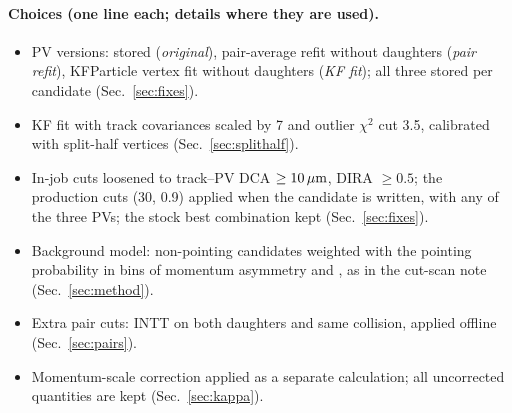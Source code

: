 \paragraph{Choices (one line each; details where they are used).}
\begin{itemize}
\item PV versions: stored (\emph{original}), pair-average refit without daughters (\emph{pair refit}), KFParticle
  vertex fit without daughters (\emph{KF fit}); all three stored per candidate (Sec.~\ref{sec:fixes}).
\item KF fit with track covariances scaled by 7 and outlier $\chi^2$ cut 3.5, calibrated with split-half vertices
  (Sec.~\ref{sec:splithalf}).
\item In-job cuts loosened to track--PV DCA $\geq 10\,\mu\mathrm{m}$, DIRA $\geq 0.5$; the production cuts (30\um, 0.9) applied
  when the candidate is written, with any of the three PVs; the stock best combination kept (Sec.~\ref{sec:fixes}).
\item Background model: non-pointing candidates weighted with the pointing probability in bins of momentum asymmetry
  and \Dzero{} \pt{}, as in the cut-scan note (Sec.~\ref{sec:method}).
\item Extra pair cuts: INTT on both daughters and same collision, applied offline (Sec.~\ref{sec:pairs}).
\item Momentum-scale correction applied as a separate calculation; all uncorrected quantities are kept
  (Sec.~\ref{sec:kappa}).
\end{itemize}
